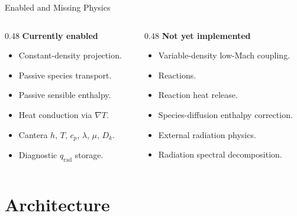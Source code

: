 \documentclass[aspectratio=169,11pt]{beamer}
\begin{document}
\begin{frame}{Enabled and Missing Physics}
  \begin{columns}[T,totalwidth=\textwidth]
    \begin{column}{0.48\textwidth}
      \textbf{Currently enabled}
      \begin{itemize}
        \item Constant-density projection.
        \item Passive species transport.
        \item Passive sensible enthalpy.
        \item Heat conduction via \(\nabla T\).
        \item Cantera \(h\), \(T\), \(c_p\), \(\lambda\), \(\mu\), \(D_k\).
        \item Diagnostic \(q_{\mathrm{rad}}\) storage.
      \end{itemize}
    \end{column}

    \begin{column}{0.48\textwidth}
      \textbf{Not yet implemented}
      \begin{itemize}
        \item Variable-density low-Mach coupling.
        \item Reactions.
        \item Reaction heat release.
        \item Species-diffusion enthalpy correction.
        \item External radiation physics.
        \item Radiation spectral decomposition.
      \end{itemize}
    \end{column}
  \end{columns}
\end{frame}

\section{Architecture}
\end{document}
